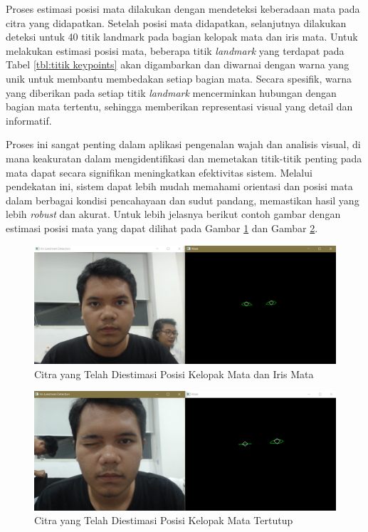 Proses estimasi posisi mata dilakukan dengan mendeteksi keberadaan mata pada citra yang didapatkan. Setelah posisi mata didapatkan, selanjutnya dilakukan deteksi untuk 40 titik landmark pada bagian kelopak mata dan iris mata. Untuk melakukan estimasi posisi mata, beberapa titik \emph{landmark} yang terdapat pada Tabel \ref{tbl:titik keypoints} akan digambarkan dan diwarnai dengan warna yang unik untuk membantu membedakan setiap bagian mata. Secara spesifik, warna yang diberikan pada setiap titik \emph{landmark} mencerminkan hubungan dengan bagian mata tertentu, sehingga memberikan representasi visual yang detail dan informatif.

Proses ini sangat penting dalam aplikasi pengenalan wajah dan analisis visual, di mana keakuratan dalam mengidentifikasi dan memetakan titik-titik penting pada mata dapat secara signifikan meningkatkan efektivitas sistem. Melalui pendekatan ini, sistem dapat lebih mudah memahami orientasi dan posisi mata dalam berbagai kondisi pencahayaan dan sudut pandang, memastikan hasil yang lebih \emph{robust} dan akurat. Untuk lebih jelasnya berikut contoh gambar dengan estimasi posisi mata yang dapat dilihat pada Gambar \ref{fig:contoh citra yang telah diestimasi pose} dan Gambar \ref{fig:citratertutup}. 

\begin{figure} [ht] \centering
    \includegraphics[scale=0.35]{gambar/bab3/iris.png}
    \caption{Citra yang Telah Diestimasi Posisi Kelopak Mata dan Iris Mata}
    \label{fig:contoh citra yang telah diestimasi pose}
\end{figure}

\begin{figure} [ht] \centering
  \includegraphics[scale=0.35]{gambar/bab3/stop.png}
  \caption{Citra yang Telah Diestimasi Posisi Kelopak Mata Tertutup}
  \label{fig:citratertutup}
\end{figure}

